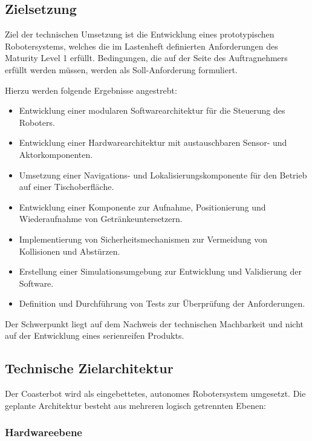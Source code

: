 \documentclass[
  a4paper,
  12pt,
  DIV=12,        %
  parskip=half,  %
  headings=small %
]{scrartcl}
\theoremstyle{definition}
\providecommand{\tightlist}{%
  \setlength{\itemsep}{0pt}\setlength{\parskip}{0pt}}
\theoremstyle{definition}
\begin{document}
\subsection{Zielsetzung}\label{zielsetzung}

Ziel der technischen Umsetzung ist die Entwicklung eines prototypischen
Robotersystems, welches die im Lastenheft definierten Anforderungen des
Maturity Level 1 erfüllt. Bedingungen, die auf der Seite des Auftragnehmers
erfüllt werden müssen, werden als Soll-Anforderung formuliert.

Hierzu werden folgende Ergebnisse angestrebt:

\begin{itemize}
\tightlist
\item
  Entwicklung einer modularen Softwarearchitektur für die Steuerung des
  Roboters.
\item
  Entwicklung einer Hardwarearchitektur mit austauschbaren Sensor- und
  Aktorkomponenten.
\item
  Umsetzung einer Navigations- und Lokalisierungskomponente für den
  Betrieb auf einer Tischoberfläche.
\item
  Entwicklung einer Komponente zur Aufnahme, Positionierung und
  Wiederaufnahme von Getränkeuntersetzern.
\item
  Implementierung von Sicherheitsmechanismen zur Vermeidung von
  Kollisionen und Abstürzen.
\item
  Erstellung einer Simulationsumgebung zur Entwicklung und Validierung
  der Software.
\item
  Definition und Durchführung von Tests zur Überprüfung der
  Anforderungen.
\end{itemize}

Der Schwerpunkt liegt auf dem Nachweis der technischen Machbarkeit und
nicht auf der Entwicklung eines serienreifen Produkts.

\subsection{Technische
Zielarchitektur}\label{technische-zielarchitektur}

Der Coasterbot wird als eingebettetes, autonomes Robotersystem
umgesetzt. Die geplante Architektur besteht aus mehreren logisch
getrennten Ebenen:

\subsubsection{Hardwareebene}\label{hardwareebene}
\end{document}
